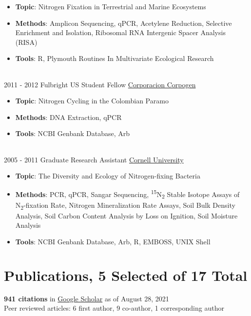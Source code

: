 \documentclass[letterpaper]{twentysecondcv3} %
\begin{document}
\begin{twenty}
{{\begin{itemize}
        \item \textbf{Topic}: Nitrogen Fixation in Terrestrial and Marine Ecosystems
	\item \textbf{Methods}: Amplicon Sequencing, qPCR, Acetylene Reduction, Selective Enrichment and Isolation, Ribosomal RNA Intergenic Spacer Analysis (RISA)
        \item \textbf{Tools}: R, Plymouth Routines In Multivariate Ecological Research
    \end{itemize}}
        }
     \\
     \twentyitem
   		{2011 -}
		{2012}
        {Fulbright US Student Fellow}
        {\href{https://www.corpogen.org/}{Corporacion Corpogen}}
        {}
        {
        {\begin{itemize}
        \item \textbf{Topic}: Nitrogen Cycling in the Colombian Paramo
	\item \textbf{Methods}: DNA Extraction, qPCR
        \item \textbf{Tools}: NCBI Genbank Database, Arb
    \end{itemize}}
    	}
    \\   
    \twentyitem
   		{2005 -}
		{2011}
        {Graduate Research Assistant}
        {\href{https://www.cornell.edu/}{Cornell University}}
        {}
        {
        \begin{itemize}
        \item \textbf{Topic}: The Diversity and Ecology of Nitrogen-fixing Bacteria
	\item \textbf{Methods}: PCR, qPCR, Sangar Sequencing, \textsuperscript{15}N\textsubscript{2} Stable Isotope Assays of N\textsubscript{2}-fixation Rate, Nitrogen Mineralization Rate Assays, Soil Bulk Density Analysis, Soil Carbon Content Analysis by Loss on Ignition, Soil Moisture Analysis
        \item \textbf{Tools}: NCBI Genbank Database, Arb, R, EMBOSS, UNIX Shell
    \end{itemize}
        }
        
\end{twenty}

\section{Publications, 5 Selected of 17 Total}
\textbf{941 citations} in \href{https://scholar.google.com/citations?user=bgdnUn8AAAAJ&hl=en}{Google Scholar} as of August 28, 2021\\
Peer reviewed articles: 6 first author, 9 co-author, 1 corresponding author
\end{document}
